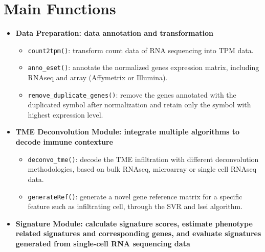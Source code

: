 \documentclass[
  12pt,
]{book}
\providecommand{\tightlist}{%
  \setlength{\itemsep}{0pt}\setlength{\parskip}{0pt}}
\theoremstyle{definition}
\theoremstyle{definition}
\theoremstyle{definition}
\theoremstyle{definition}
\theoremstyle{remark}
\begin{document}
\hypertarget{main-functions}{%
\section{Main Functions}\label{main-functions}}

\begin{itemize}
\item
  \textbf{Data Preparation: data annotation and transformation}

  \begin{itemize}
  \tightlist
  \item
    \texttt{count2tpm()}: transform count data of RNA sequencing into TPM data.
  \item
    \texttt{anno\_eset()}: annotate the normalized genes expression matrix, including RNAseq and array (Affymetrix or Illumina).
  \item
    \texttt{remove\_duplicate\_genes()}: remove the genes annotated with the duplicated symbol after normalization and retain only the symbol with highest expression level.
  \end{itemize}
\item
  \textbf{TME Deconvolution Module: integrate multiple algorithms to decode immune contexture}

  \begin{itemize}
  \tightlist
  \item
    \texttt{deconvo\_tme()}: decode the TME infiltration with different deconvolution methodologies, based on bulk RNAseq, microarray or single cell RNAseq data.
  \item
    \texttt{generateRef()}: generate a novel gene reference matrix for a specific feature such as infiltrating cell, through the SVR and lsei algorithm.
  \end{itemize}
\item
  \textbf{Signature Module: calculate signature scores, estimate phenotype related signatures and corresponding genes, and evaluate signatures generated from single-cell RNA sequencing data }


\end{itemize}
\end{document}
